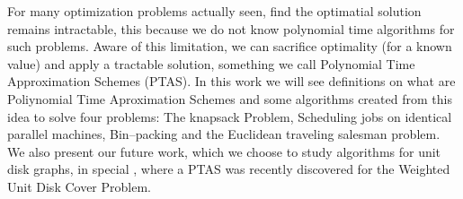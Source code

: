 For many optimization problems actually seen, find the optimatial solution remains intractable, this because we do not know polynomial time algorithms for such problems. Aware of this limitation, we can sacrifice optimality (for a known value) \cite{Vignatti} and apply a tractable solution, something we call Polynomial Time Approximation Schemes (PTAS). In this work we will see definitions on what are Poliynomial Time Aproximation Schemes and some algorithms created from this idea to solve four problems: The knapsack Problem, Scheduling jobs on identical parallel machines, Bin--packing and the Euclidean traveling salesman problem. We also present our future work, which we choose to study algorithms for unit disk graphs, in special  \cite{li}, where a PTAS was recently discovered for the Weighted Unit Disk Cover Problem.